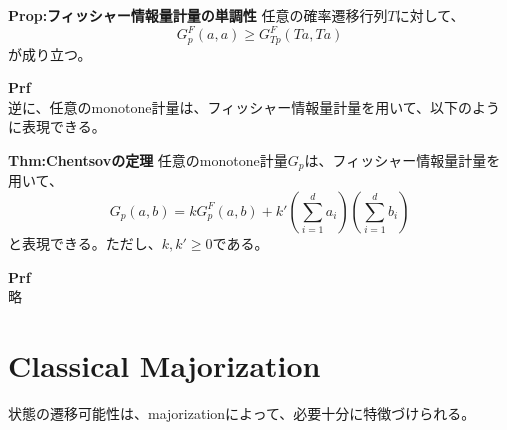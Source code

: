 \documentclass[a4paper,11pt]{jsarticle}
\numberwithin{equation}{section}
\begin{document}
\begin{itembox}[l]{\textbf{Prop:フィッシャー情報量計量の単調性}}
    任意の確率遷移行列$T$に対して、
    \begin{equation}
        G_p^F (a,a) \geq G_{Tp}^F (Ta,Ta)
    \end{equation}
    が成り立つ。
\end{itembox}
\textbf{Prf}\\

逆に、任意のmonotone計量は、フィッシャー情報量計量を用いて、以下のように表現できる。\\
\begin{itembox}[l]{\textbf{Thm:Chentsovの定理}}
    任意のmonotone計量$G_p$は、フィッシャー情報量計量を用いて、
    \begin{equation}
        G_p(a,b) = kG_p^F (a,b)+k'(\sum_{i=1}^{d}a_i)(\sum_{i=1}^{d}b_i)
    \end{equation}
    と表現できる。ただし、$k,k' \geq 0$である。
\end{itembox}
\textbf{Prf}\\
略\\

\section{Classical Majorization}
状態の遷移可能性は、majorizationによって、必要十分に特徴づけられる。\\
\end{document}
